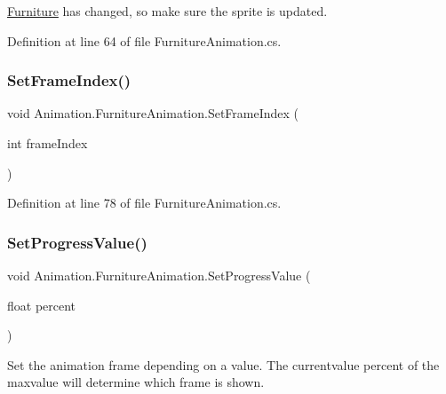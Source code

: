 \hyperlink{class_furniture}{Furniture} has changed, so make sure the sprite is updated. 



Definition at line 64 of file Furniture\+Animation.\+cs.

\mbox{\label{class_animation_1_1_furniture_animation_ac1f264484fde14992bd962a03f57e2b8}} 
\subsubsection{\texorpdfstring{Set\+Frame\+Index()}{SetFrameIndex()}}
{\footnotesize\ttfamily void Animation.\+Furniture\+Animation.\+Set\+Frame\+Index (\begin{DoxyParamCaption}\item[{int}]{frame\+Index }\end{DoxyParamCaption})}



Definition at line 78 of file Furniture\+Animation.\+cs.

\mbox{\label{class_animation_1_1_furniture_animation_ad984276ce0ed22c53012ff9854e0f67b}} 
\subsubsection{\texorpdfstring{Set\+Progress\+Value()}{SetProgressValue()}}
{\footnotesize\ttfamily void Animation.\+Furniture\+Animation.\+Set\+Progress\+Value (\begin{DoxyParamCaption}\item[{float}]{percent }\end{DoxyParamCaption})}



Set the animation frame depending on a value. The currentvalue percent of the maxvalue will determine which frame is shown. 



